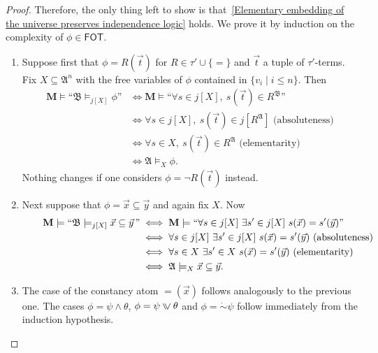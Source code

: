\documentclass[a4paper]{amsart}
\theoremstyle{definition}
\theoremstyle{remark}
\newcommand{\A}{\mathcal{A}}
\newcommand{\B}{\mathcal{B}}
\DeclareMathOperator{\dep}{\mathop{=}}
\newcommand{\vx}{\vec{x}}
\newcommand{\vy}{\vec{y}}
\newcommand\ivee{\mathrel{\rotatebox[origin=c]{270}{$\geqslant$}}}
\newcommand{\cneg}{\mathord{\dot{\sim}}}
\newcommand\fot{\mathsf{FOT}}
\theoremstyle{definition}
\renewcommand{\A}{\mathfrak{A}}
\renewcommand{\B}{\mathfrak{B}}
\newcommand{\bM}{\mathbf{M}}
\begin{document}
\begin{proof}
    
    Therefore, the only thing left to show is that~\eqref{Elementary embedding of the universe preserves independence logic} holds. We prove it by induction on the complexity of $\phi\in\fot$.
    \begin{enumerate}
        \item Suppose first that $\phi = R(\vec t)$ for $R\in\tau'\cup\{=\}$ and $\vec t$ a tuple of $\tau'$-terms. Fix $X\subseteq\A^n$ with the free variables of $\phi$ contained in $\{v_i\mid i\leq n\} $. Then
    \begin{align*}
        \bM\models\text{``$\B\models_{j[X]}\phi$''} &\iff \bM\models\text{``$\forall s\in j[X],\ s(\vec t)\in R^\B$''} \\
        &\iff \forall s\in j[X],\ s(\vec t)\in j[R^{\A}] \text{ (absoluteness)} \\
        &\iff \forall s\in X,\ s(\vec t)\in R^\A \text{ (elementarity)} \\
        &\iff \A\models_X\phi.
    \end{align*}
    Nothing changes if one considers $\phi = \neg R(\vec t)$ instead.
    
    \item Next suppose that $\phi = \vx\subseteq\vy$ and again fix $X$. Now
    \begin{align*}
        \hspace{2em}\bM\models\text{``$\B\models_{j[X]}\vx\subseteq\vy$\,''} &\iff \bM\models\text{``$\forall s\in j[X]\ \exists s'\in j[X]\ s(\vx)=s'(\vy)$''} \\
        &\iff \forall s\in j[X]\ \exists s'\in j[X]\ s(\vx)=s'(\vy) \text{ (absoluteness)} \\
        &\iff \forall s\in X\ \exists s'\in X\ s(\vx)=s'(\vy) \text{ (elementarity)} \\
        &\iff \A\models_X\vx\subseteq\vy.
    \end{align*}

    \item The case of the constancy atom $\dep(\vx)$ follows analogously to the previous one. The cases $\phi=\psi\land\theta$, $\phi = \psi\ivee\theta$ and $\phi = \cneg\psi$ follow immediately from the induction hypothesis.
    

\end{enumerate}
\end{proof}
\end{document}
